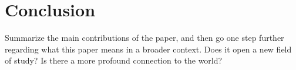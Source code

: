 \section{Conclusion}\label{sec:conclusion}

Summarize the main contributions of the paper, and then go one step further regarding what this paper means in a broader context.
Does it open a new field of study?
Is there a more profound connection to the world?
